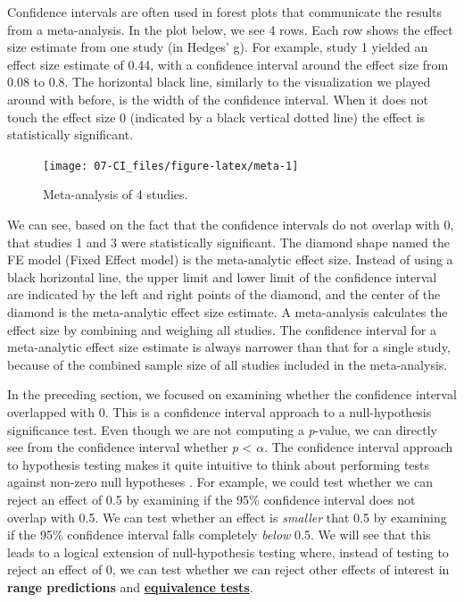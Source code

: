 \documentclass[
  oneside]{krantz}
\begin{document}
Confidence intervals are often used in forest plots that communicate the results from a meta-analysis. In the plot below, we see 4 rows. Each row shows the effect size estimate from one study (in Hedges' g). For example, study 1 yielded an effect size estimate of 0.44, with a confidence interval around the effect size from 0.08 to 0.8. The horizontal black line, similarly to the visualization we played around with before, is the width of the confidence interval. When it does not touch the effect size 0 (indicated by a black vertical dotted line) the effect is statistically significant.



\begin{figure}

{\centering \texttt{[image: 07-CI\_files/figure-latex/meta-1]} 

}

\caption{Meta-analysis of 4 studies.}\label{fig:meta}
\end{figure}

We can see, based on the fact that the confidence intervals do not overlap with 0, that studies 1 and 3 were statistically significant. The diamond shape named the FE model (Fixed Effect model) is the meta-analytic effect size. Instead of using a black horizontal line, the upper limit and lower limit of the confidence interval are indicated by the left and right points of the diamond, and the center of the diamond is the meta-analytic effect size estimate. A meta-analysis calculates the effect size by combining and weighing all studies. The confidence interval for a meta-analytic effect size estimate is always narrower than that for a single study, because of the combined sample size of all studies included in the meta-analysis.

In the preceding section, we focused on examining whether the confidence interval overlapped with 0. This is a confidence interval approach to a null-hypothesis significance test. Even though we are not computing a \emph{p}-value, we can directly see from the confidence interval whether \emph{p} \textless{} \(\alpha\). The confidence interval approach to hypothesis testing makes it quite intuitive to think about performing tests against non-zero null hypotheses \citep{bauer_unifying_1996}. For example, we could test whether we can reject an effect of 0.5 by examining if the 95\% confidence interval does not overlap with 0.5. We can test whether an effect is \emph{smaller} that 0.5 by examining if the 95\% confidence interval falls completely \emph{below} 0.5. We will see that this leads to a logical extension of null-hypothesis testing where, instead of testing to reject an effect of 0, we can test whether we can reject other effects of interest in \textbf{range predictions} and \protect\hyperlink{equivalencetest}{\textbf{equivalence tests}}.
\end{document}

